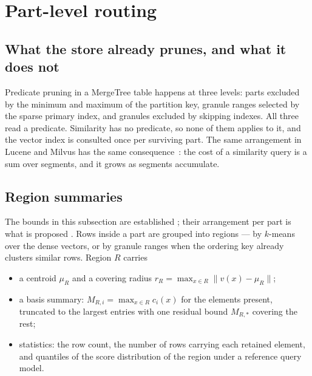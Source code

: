 \section{Part-level routing}
\label{sec:routing}

\subsection{What the store already prunes, and what it does not}

\prior{} Predicate pruning in a MergeTree table happens at three levels: parts
excluded by the minimum and maximum of the partition key, granule ranges
selected by the sparse primary index, and granules excluded by skipping
indexes. All three read a predicate. Similarity has no predicate, so none of
them applies to it, and the vector index is consulted once per surviving part.
The same arrangement in Lucene and Milvus has the same
consequence~\cite{lucene,wang2021milvus}: the cost of a similarity query is a
sum over segments, and it grows as segments accumulate.

\subsection{Region summaries}

The bounds in this subsection are established \prior{}; their arrangement per
part is what is proposed \proposed{}. Rows inside a part are grouped into
regions --- by $k$-means over the dense vectors, or by granule ranges when the
ordering key already clusters similar rows. Region $R$ carries

\begin{itemize}[leftmargin=*,itemsep=1pt]
\item a centroid $\mu_R$ and a covering radius
  $r_R = \max_{x \in R}\lVert v(x) - \mu_R \rVert$;
\item a basis summary: $M_{R,i} = \max_{x \in R} c_i(x)$ for the elements
  present, truncated to the largest entries with one residual bound
  $M_{R,\ast}$ covering the rest;
\item statistics: the row count, the number of rows carrying each retained
  element, and quantiles of the score distribution of the region under a
  reference query model.
\end{itemize}

